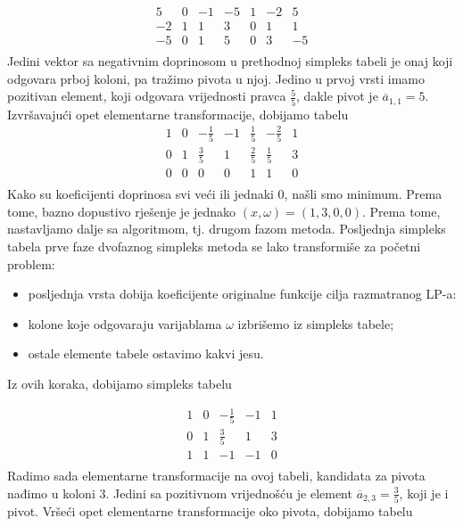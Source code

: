 \documentclass[a4paper, utf8, 11pt, colorlinks]{book}
\begin{document}
$$ \begin{array}{cccccc|c}
 	 5 & 0 & -1 & -5 & 1 & -2 & 5 \\
	-2&1  & 1 & 3 & 0 & 1 & 1 \\ \hline
	 -5 & 0 & 1 & 5 & 0 & 3 & -5 \\
 \end{array}
 $$
 Jedini vektor sa negativnim doprinosom u prethodnoj simpleks tabeli je 
 onaj koji odgovara prboj koloni, pa tražimo pivota u njoj. 
 Jedino u prvoj vrsti imamo pozitivan element, koji odgovara vrijednosti pravca $\frac{5}{5}$, dakle pivot je $\overline{a}_{1,1}=5$. Izvršavajući opet elementarne transformacije, dobijamo tabelu 
 $$ \begin{array}{cccccc|c}
        1 & 0 & -\frac{1}{5}  & -1   &  \frac{1}{5}     & -\frac{2}{5}  & 1                    \\
        0 & 1 & \frac{3}{5}   &  1   &   \frac{2}{5}  & \frac{1}{5}      & 3                   \\ \hline
        0 & 0 & 0            &  0   &   1        & 1                     & 0                                 \\
    \end{array}
$$
Kako su koeficijenti doprinosa svi veći ili jednaki 0, našli smo minimum. 
Prema tome, bazno dopustivo rješenje je jednako $(x, \omega)= (1,3, 0, 0)$. Prema tome, nastavljamo dalje sa algoritmom, tj. drugom fazom metoda.  Posljednja simpleks tabela prve faze dvofaznog simpleks metoda se lako transformiše za početni problem: 
\begin{itemize}
	\item posljednja vrsta dobija koeficijente originalne funkcije cilja razmatranog LP-a:
	\item kolone koje odgovaraju varijablama $\omega$ izbrišemo iz simpleks tabele;
	\item ostale elemente tabele ostavimo kakvi jesu.
\end{itemize}
Iz ovih koraka, dobijamo simpleks tabelu 

 $$ \begin{array}{cccc|c}
 	   1 & 0 & -\frac{1}{5}     & -1   & 1 \\
 	   0 & 1 & \frac{3}{5}      & 1    & 3 \\ \hline
       1 & 1 & -1               & -1   & 0 \\
    \end{array}
$$
Radimo sada elementarne transformacije na ovoj tabeli, kandidata za pivota nađimo u 
koloni 3. Jedini sa pozitivnom vrijednošću je element $\overline{a}_{2,3} = \frac{3}{5}$, koji je i pivot. 
Vršeći opet elementarne transformacije oko pivota, dobijamo tabelu 
\end{document}
